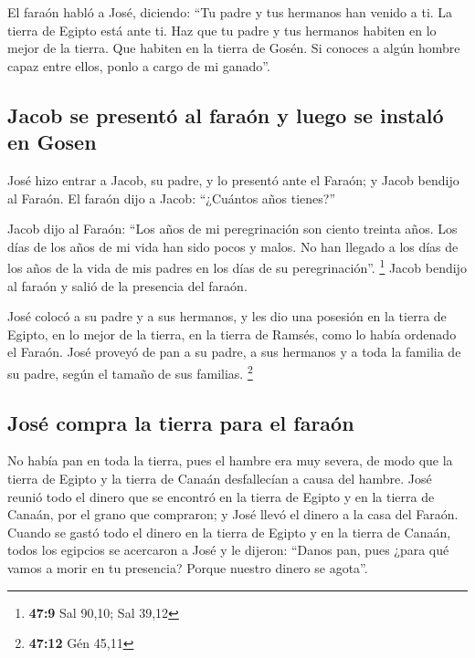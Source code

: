 \begin{paracol}{2}
 El faraón habló a José, diciendo: ``Tu padre y tus
hermanos han venido a ti.  La tierra de Egipto está ante
ti. Haz que tu padre y tus hermanos habiten en lo mejor de la tierra.
Que habiten en la tierra de Gosén. Si conoces a algún hombre capaz entre
ellos, ponlo a cargo de mi ganado''.

\hypertarget{jacob-se-presentuxf3-al-farauxf3n-y-luego-se-instaluxf3-en-gosen}{%
\subsection{Jacob se presentó al faraón y luego se instaló en
Gosen}\label{jacob-se-presentuxf3-al-farauxf3n-y-luego-se-instaluxf3-en-gosen}}

 José hizo entrar a Jacob, su padre, y lo presentó ante el
Faraón; y Jacob bendijo al Faraón.  El faraón dijo a
Jacob: ``¿Cuántos años tienes?''

 Jacob dijo al Faraón: ``Los años de mi peregrinación son
ciento treinta años. Los días de los años de mi vida han sido pocos y
malos. No han llegado a los días de los años de la vida de mis padres en
los días de su peregrinación''. \footnote{\textbf{47:9} Sal 90,10; Sal
  39,12}  Jacob bendijo al faraón y salió de la presencia
del faraón.

 José colocó a su padre y a sus hermanos, y les dio una
posesión en la tierra de Egipto, en lo mejor de la tierra, en la tierra
de Ramsés, como lo había ordenado el Faraón.  José
proveyó de pan a su padre, a sus hermanos y a toda la familia de su
padre, según el tamaño de sus familias. \footnote{\textbf{47:12} Gén
  45,11}

\hypertarget{josuxe9-compra-la-tierra-para-el-farauxf3n}{%
\subsection{José compra la tierra para el
faraón}\label{josuxe9-compra-la-tierra-para-el-farauxf3n}}

 No había pan en toda la tierra, pues el hambre era muy
severa, de modo que la tierra de Egipto y la tierra de Canaán
desfallecían a causa del hambre.  José reunió todo el
dinero que se encontró en la tierra de Egipto y en la tierra de Canaán,
por el grano que compraron; y José llevó el dinero a la casa del Faraón.
 Cuando se gastó todo el dinero en la tierra de Egipto y
en la tierra de Canaán, todos los egipcios se acercaron a José y le
dijeron: ``Danos pan, pues ¿para qué vamos a morir en tu presencia?
Porque nuestro dinero se agota''.


\end{paracol}
